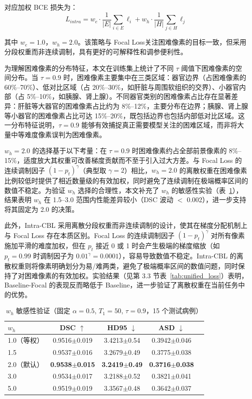 对应加权 BCE 损失为：
\begin{equation}
L_{intra}=w_e\cdot \frac{1}{|E|}\sum_{i\in E}\ell_i + w_h\cdot \frac{1}{|H|}\sum_{j\in H}\ell_j
\end{equation}

其中 $w_e = 1.0$，$w_h = 2.0$。该策略与 Focal Loss\cite{lin2017focal}关注困难像素的目标一致，但采用分段权重而非连续调制，具有更好的可解释性和调参便利性。

为理解困难像素的分布特征，本文在训练集上统计了不同 $\tau$ 阈值下困难像素的空间分布。当 $\tau{=}0.9$ 时，困难像素主要集中在三类区域：器官边界（占困难像素的 60\%--70\%）、低对比区域（占 20\%--30\%，如肝脏与周围软组织的交界）、小器官内部（占 5\%--10\%，如胰腺、肾上腺）。不同器官类别的困难像素占比存在显著差异：肝脏等大器官的困难像素占比约为 8\%--12\%，主要分布在边界；胰腺、肾上腺等小器官的困难像素占比可达 15\%--20\%，既包括边界也包括内部低对比区域。这一分布特征说明，$\tau{=}0.9$ 能够有效捕捉真正需要模型关注的困难区域，而非将大量中等难度像素误判为困难像素。

$w_h{=}2.0$ 的选择基于以下考量：在 $\tau{=}0.9$ 时困难像素约占全部前景像素的 8\%--15\%，适度放大其权重可改善梯度贡献而不至于引入过大方差。与 Focal Loss 的连续调制因子 $(1-p_t)^\gamma$（典型取 $\gamma=2$）相比，$w_h{=}2.0$ 的离散权重在困难像素比例较低时提供了相近数量级的有效加权，同时避免了连续调制在极端概率区间的数值不稳定。为验证 $w_h$ 选择的合理性，本文补充了 $w_h$ 的敏感性实验（表~\ref{tab:wh_ablation}），结果表明 $w_h$ 在 1.5--3.0 范围内性能差异较小（DSC 波动 $<$ 0.002），进一步支持将其固定为 2.0 的决策。

此外，Intra-CBL 采用离散分段权重而非连续调制的设计，使其在梯度分配机制上与 Focal Loss 存在本质区别。Focal Loss 的连续调制因子 $(1-p_t)^\gamma$ 对所有像素施加平滑的难度加权，但在 $p_t$ 接近 0 或 1 时会产生极端的梯度缩放（如 $p_t{=}0.99$ 时调制因子为 $0.01^\gamma{=}0.0001$），容易导致数值不稳定。Intra-CBL 的离散权重则将像素明确划分为易/难两类，避免了极端概率区间的数值问题，同时保持了对困难像素的有效加权。实验结果（见第 3.3 节表~\ref{tab:unified_loss}）表明，Baseline-Focal 的表现反而略低于 Baseline，进一步验证了离散权重在当前任务中的优势。

\begin{table}[htbp]
  \centering
  \caption{$w_h$ 敏感性验证（固定 $\alpha{=}0.5$, $T_1{=}50$, $\tau{=}0.9$，15 个测试病例）}
  \label{tab:wh_ablation}
  \scriptsize
  \begin{tabular}{lcccc}
    \hline
    $w_h$ & DSC $\uparrow$ & HD95 $\downarrow$ & ASD $\downarrow$ \\
    \hline
    1.0（等权） & 0.9516$\pm$0.019 & 3.4213$\pm$0.54 & 0.3942$\pm$0.046 \\
    1.5 & 0.9537$\pm$0.016 & 3.2679$\pm$0.49 & 0.3775$\pm$0.038 \\
    2.0（默认） & \textbf{0.9538$\pm$0.015} & \textbf{3.2419$\pm$0.49} & \textbf{0.3716$\pm$0.038} \\
    3.0 & 0.9534$\pm$0.017 & 3.2188$\pm$0.52 & 0.3821$\pm$0.041 \\
    5.0 & 0.9519$\pm$0.019 & 3.3567$\pm$0.48 & 0.3642$\pm$0.037 \\
    \hline
  \end{tabular}
\end{table}

